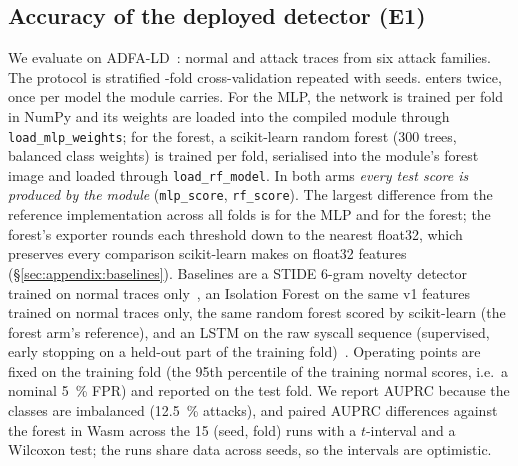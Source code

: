 \subsection{Accuracy of the deployed detector (E1)}
\label{sec:eval:e1}
We evaluate on ADFA-LD~\cite{adfa-ld}: \eOneNormal{} normal and
\eOneAttack{} attack traces from six attack families. The protocol is
stratified \eOneFolds-fold cross-validation repeated with \eOneSeeds{} seeds.
\sys enters twice, once per model the module carries. For the MLP, the
network is trained per fold in NumPy and its weights are loaded into the
compiled module through \texttt{load\_mlp\_weights}; for the forest, a
scikit-learn random forest (300 trees, balanced class weights) is trained
per fold, serialised into the module's forest image and loaded through
\texttt{load\_rf\_model}. In both arms \emph{every test score is produced by
the module} (\texttt{mlp\_score}, \texttt{rf\_score}). The largest
difference from the reference implementation across all folds is
\eOneWasmNumpyMaxDiff{} for the MLP and \eOneWasmSklearnMaxDiff{} for the
forest; the forest's exporter rounds each threshold down to the nearest
float32, which preserves every comparison scikit-learn makes on float32
features (\S\ref{sec:appendix:baselines}). Baselines are a STIDE 6-gram
novelty detector trained on normal traces only~\cite{stide}, an Isolation
Forest on the same v1 features trained on normal traces only, the same
random forest scored by scikit-learn (the forest arm's reference), and an
LSTM on the raw syscall sequence (supervised, early stopping on a held-out
part of the training fold)~\cite{kim-lstm}. Operating points are fixed on
the training fold (the 95th percentile of the training normal scores, i.e.\
a nominal \SI{5}{\percent} FPR) and reported on the test fold. We report
AUPRC because the classes are imbalanced (\SI{12.5}{\percent} attacks), and
paired AUPRC differences against the forest in Wasm across the 15 (seed,
fold) runs with a $t$-interval and a Wilcoxon test; the runs share data
across seeds, so the intervals are optimistic.

